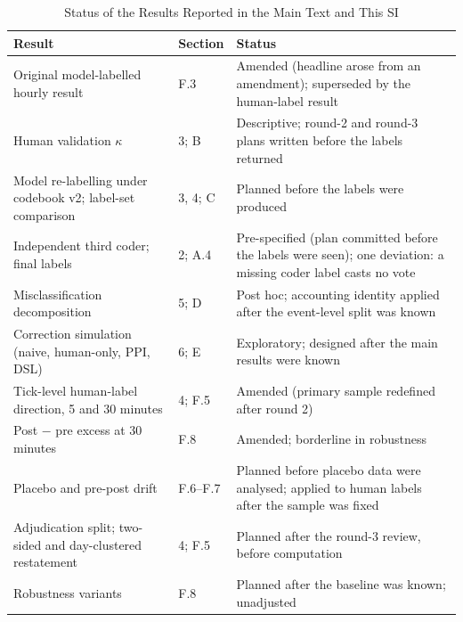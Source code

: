 \documentclass[11pt]{article}
\begin{document}
\begin{table}[h]
\centering
\small
\caption{Status of the Results Reported in the Main Text and This SI}
\label{tab:status}
\begin{tabular}{p{6.2cm}p{2cm}p{6.8cm}}
\toprule
Result & Section & Status \\
\midrule
Original model-labelled hourly result & F.3 & Amended (headline arose from an amendment); superseded by the human-label result \\
Human validation $\kappa$ & 3; B & Descriptive; round-2 and round-3 plans written before the labels returned \\
Model re-labelling under codebook v2; label-set comparison & 3, 4; C & Planned before the labels were produced \\
Independent third coder; final labels & 2; A.4 & Pre-specified (plan committed before the labels were seen); one deviation: a missing coder label casts no vote \\
Misclassification decomposition & 5; D & Post hoc; accounting identity applied after the event-level split was known \\
Correction simulation (naive, human-only, PPI, DSL) & 6; E & Exploratory; designed after the main results were known \\
Tick-level human-label direction, 5 and 30 minutes & 4; F.5 & Amended (primary sample redefined after round 2) \\
Post $-$ pre excess at 30 minutes & F.8 & Amended; borderline in robustness \\
Placebo and pre-post drift & F.6--F.7 & Planned before placebo data were analysed; applied to human labels after the sample was fixed \\
Adjudication split; two-sided and day-clustered restatement & 4; F.5 & Planned after the round-3 review, before computation \\
Robustness variants & F.8 & Planned after the baseline was known; unadjusted \\
\bottomrule
\end{tabular}
\end{table}
\end{document}
